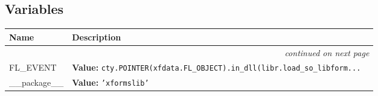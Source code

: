   \subsection{Variables}

    \vspace{-1cm}
\hspace{\varindent}\begin{longtable}{|p{\varnamewidth}|p{\vardescrwidth}|l}
\cline{1-2}
\cline{1-2} \centering \textbf{Name} & \centering \textbf{Description}& \\
\cline{1-2}
\endhead\cline{1-2}\multicolumn{3}{r}{\small\textit{continued on next page}}\\\endfoot\cline{1-2}
\endlastfoot\raggedright F\-L\-\_\-E\-V\-E\-N\-T\- & \raggedright \textbf{Value:} 
{\tt cty.POINTER(xfdata.FL\_OBJECT).in\_dll(libr.load\_so\_libform\texttt{...}}&\\
\cline{1-2}
\raggedright \_\-\_\-p\-a\-c\-k\-a\-g\-e\-\_\-\_\- & \raggedright \textbf{Value:} 
{\tt \texttt{'}\texttt{xformslib}\texttt{'}}&\\
\cline{1-2}
\end{longtable}

